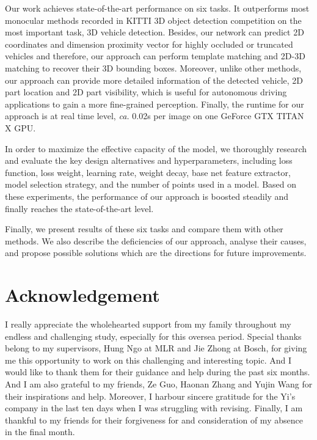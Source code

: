 \documentclass[a4paper,12pt]{article}
\begin{document}
Our work achieves state-of-the-art performance on six tasks. It outperforms most monocular methods recorded in KITTI 3D object detection competition on the most important task, 3D vehicle detection. Besides, our network can predict 2D coordinates and dimension proximity vector for highly occluded or truncated vehicles and therefore, our approach can perform template matching and 2D-3D matching to recover their 3D bounding boxes. Moreover, unlike other methods, our approach can provide more detailed information of the detected vehicle, \eg 2D part location and 2D part visibility, which is useful for autonomous driving applications to gain a more  fine-grained perception. Finally, the runtime for our approach is at real time level, \textit{ca.} 0.02s per image on one GeForce GTX TITAN X GPU. 

In order to maximize the effective capacity of the model, we thoroughly research and evaluate the key design alternatives and hyperparameters, including loss function, loss weight, learning rate, weight decay, base net feature extractor, model selection strategy, and the number of points used in a model. Based on these experiments, the performance of our approach is boosted steadily and finally reaches the state-of-the-art level.

Finally, we present results of these six tasks and compare them with other methods. We also describe the deficiencies of our approach, analyse their causes, and propose possible solutions which are the directions for future improvements. 
\clearpage



\clearpage



\section*{Acknowledgement}
I really appreciate the wholehearted support from my family throughout my endless and challenging  study, especially for this oversea period. Special thanks belong to my supervisors, Hung Ngo at MLR and Jie Zhong at Bosch, for giving me this opportunity to work on this challenging and interesting topic. And I would like to thank them for their guidance and help during the past six months. And I am also grateful to my friends, Ze Guo, Haonan Zhang and Yujin Wang for their inspirations and help. Moreover, I harbour sincere gratitude for the Yi's company in the last ten days when I was struggling with revising. Finally, I am thankful to my friends for their forgiveness for and consideration of my absence in the final month.

\Affirmation
\end{document}
